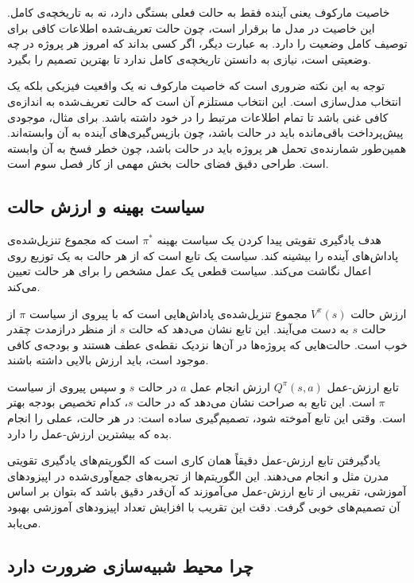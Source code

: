 خاصیت مارکوف یعنی آینده فقط به حالت فعلی بستگی دارد، نه به
تاریخچه‌ی کامل. این خاصیت در مدل ما برقرار است، چون حالت
تعریف‌شده اطلاعات کافی برای توصیف کامل وضعیت را دارد. به عبارت
دیگر، اگر کسی بداند که امروز هر پروژه در چه وضعیتی است، نیازی
به دانستن تاریخچه‌ی کامل ندارد تا بهترین تصمیم را بگیرد.

توجه به این نکته ضروری است که خاصیت مارکوف نه یک واقعیت
فیزیکی بلکه یک انتخاب مدل‌سازی است. این انتخاب مستلزم آن است
که حالت تعریف‌شده به اندازه‌ی کافی غنی باشد تا تمام اطلاعات
مرتبط را در خود داشته باشد. برای مثال، موجودی پیش‌پرداخت باقی‌مانده
باید در حالت باشد، چون بازپس‌گیری‌های آینده به آن وابسته‌اند.
همین‌طور شمارنده‌ی تحمل هر پروژه باید در حالت باشد، چون
خطر فسخ به آن وابسته است. طراحی دقیق فضای حالت بخش مهمی
از کار فصل سوم است.

\subsection{سیاست بهینه و ارزش حالت}
\label{subsec:policy_value}

هدف یادگیری تقویتی پیدا کردن یک سیاست بهینه $\pi^*$ است که
مجموع تنزیل‌شده‌ی پاداش‌های آینده را بیشینه کند. سیاست یک تابع
است که از هر حالت به یک توزیع روی اعمال نگاشت می‌کند. سیاست
قطعی یک عمل مشخص را برای هر حالت تعیین می‌کند.

ارزش حالت $V^\pi(s)$ مجموع تنزیل‌شده‌ی پاداش‌هایی است که با
پیروی از سیاست $\pi$ از حالت $s$ به دست می‌آیند. این تابع
نشان می‌دهد که حالت $s$ از منظر درازمدت چقدر خوب است. حالت‌هایی
که پروژه‌ها در آن‌ها نزدیک نقطه‌ی عطف هستند و بودجه‌ی کافی
موجود است، باید ارزش بالایی داشته باشند.

تابع ارزش-عمل $Q^\pi(s, a)$ ارزش انجام عمل $a$ در حالت $s$ و
سپس پیروی از سیاست $\pi$ است. این تابع به صراحت نشان می‌دهد که
در حالت $s$، کدام تخصیص بودجه بهتر است. وقتی این تابع آموخته
شود، تصمیم‌گیری ساده است: در هر حالت، عملی را انجام بده که
بیشترین ارزش-عمل را دارد.

یادگیرفتن تابع ارزش-عمل دقیقاً همان کاری است که الگوریتم‌های
یادگیری تقویتی مدرن مثل  و  انجام می‌دهند.
این الگوریتم‌ها از تجربه‌های جمع‌آوری‌شده در اپیزودهای آموزشی،
تقریبی از تابع ارزش-عمل می‌آموزند که آن‌قدر دقیق باشد که بتوان
بر اساس آن تصمیم‌های خوبی گرفت. دقت این تقریب با افزایش تعداد
اپیزودهای آموزشی بهبود می‌یابد.

\subsection{چرا محیط شبیه‌سازی ضرورت دارد}
\label{subsec:simulation_necessity}

